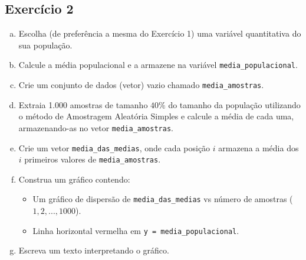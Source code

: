 \documentclass[12pt]{article}
\begin{document}
\subsection*{Exercício 2}

\begin{enumerate}[a)]
    \item Escolha (de preferência a mesma do Exercício 1) uma variável quantitativa do sua população.
    \item Calcule a média populacional e a armazene na variável \texttt{media\_populacional}.
    \item Crie um conjunto de dados (vetor) vazio chamado \texttt{media\_amostras}.
    \item Extraia 1.000 amostras de tamanho $40\%$ do tamanho da população utilizando o método de Amostragem Aleatória Simples e calcule a média de cada uma, armazenando-as no vetor \texttt{media\_amostras}.
    \item Crie um vetor \texttt{media\_das\_medias}, onde cada posição $i$ armazena a média dos $i$ primeiros valores de \texttt{media\_amostras}.
    \item Construa um gráfico contendo:
        \begin{itemize}
            \item Um gráfico de dispersão de \texttt{media\_das\_medias} vs número de amostras ($1, 2, ..., 1000$).
            \item Linha horizontal vermelha em \texttt{y = media\_populacional}.
        \end{itemize}
    \item Escreva um texto interpretando o gráfico.
\end{enumerate}
\end{document}

